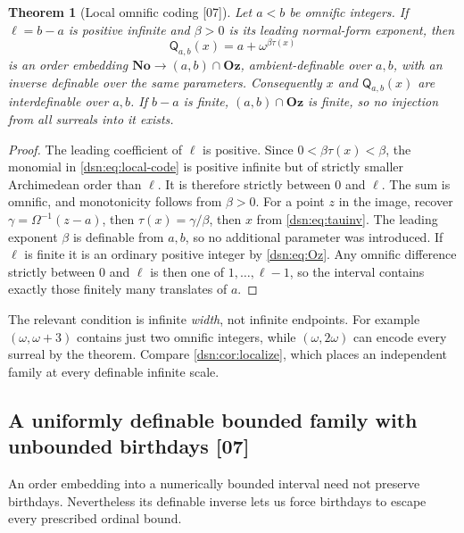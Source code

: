 \documentclass[11pt,a4paper]{article}
\numberwithin{equation}{section}
\newtheorem{theorem}{Theorem}[section]
\theoremstyle{definition}
\theoremstyle{remark}
\newcommand{\No}{\mathbf{No}}
\newcommand{\Oz}{\mathbf{Oz}}
\newcommand{\Mc}{\mathsf Q}
\newcommand{\src}[1]{\textup{\textsf{\small[#1]}}}
\begin{document}
\begin{theorem}[Local omnific coding \src{07}]\label{dsn:thm:local-code}
Let $a<b$ be omnific integers. If $\ell=b-a$ is positive infinite and
$\beta>0$ is its leading normal-form exponent, then
\begin{equation}\label{dsn:eq:local-code}
 \Mc_{a,b}(x)=a+\omega^{\beta\tau(x)}
\end{equation}
is an order embedding $\No\to(a,b)\cap\Oz$, ambient-definable over $a,b$,
with an inverse definable over the same parameters. Consequently $x$ and
$\Mc_{a,b}(x)$ are interdefinable over $a,b$. If $b-a$ is finite,
$(a,b)\cap\Oz$ is finite, so no injection from all surreals into it
exists.
\end{theorem}
\begin{proof}
The leading coefficient of $\ell$ is positive. Since
$0<\beta\tau(x)<\beta$, the monomial in \eqref{dsn:eq:local-code} is
positive infinite but of strictly smaller Archimedean order than $\ell$.
It is therefore strictly between $0$ and $\ell$. The sum is omnific, and
monotonicity follows from $\beta>0$. For a point $z$ in the image, recover
$\gamma=\Omega^{-1}(z-a)$, then $\tau(x)=\gamma/\beta$, then $x$ from
\eqref{dsn:eq:tauinv}. The leading exponent $\beta$ is definable from
$a,b$, so no additional parameter was introduced. If $\ell$ is finite it is
an ordinary positive integer by \eqref{dsn:eq:Oz}. Any omnific difference
strictly between $0$ and $\ell$ is then one of $1,\ldots,\ell-1$, so the
interval contains exactly those finitely many translates of $a$.
\end{proof}

The relevant condition is infinite \emph{width}, not infinite endpoints.
For example $(\omega,\omega+3)$ contains just two omnific integers, while
$(\omega,2\omega)$ can encode every surreal by the theorem. Compare
\cref{dsn:cor:localize}, which places an independent family at every
definable infinite scale.

\subsection{A uniformly definable bounded family with unbounded birthdays \src{07}}

An order embedding into a numerically bounded interval need not preserve
birthdays. Nevertheless its definable inverse lets us force birthdays to
escape every prescribed ordinal bound.
\end{document}
